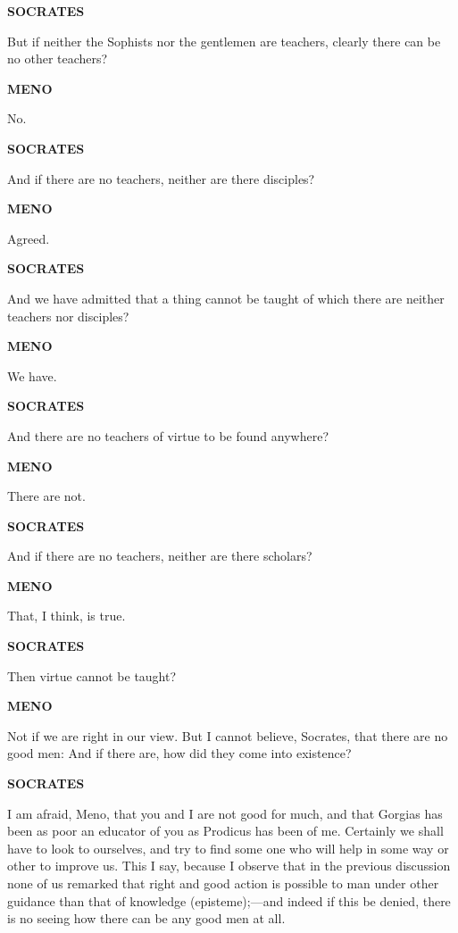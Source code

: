 \documentclass[11pt,letter]{article}
\begin{document}
\par \textbf{SOCRATES}
\par   But if neither the Sophists nor the gentlemen are teachers, clearly there can be no other teachers?

\par \textbf{MENO}
\par   No.

\par \textbf{SOCRATES}
\par   And if there are no teachers, neither are there disciples?

\par \textbf{MENO}
\par   Agreed.

\par \textbf{SOCRATES}
\par   And we have admitted that a thing cannot be taught of which there are neither teachers nor disciples?

\par \textbf{MENO}
\par   We have.

\par \textbf{SOCRATES}
\par   And there are no teachers of virtue to be found anywhere?

\par \textbf{MENO}
\par   There are not.

\par \textbf{SOCRATES}
\par   And if there are no teachers, neither are there scholars?

\par \textbf{MENO}
\par   That, I think, is true.

\par \textbf{SOCRATES}
\par   Then virtue cannot be taught?

\par \textbf{MENO}
\par   Not if we are right in our view. But I cannot believe, Socrates, that there are no good men:  And if there are, how did they come into existence?

\par \textbf{SOCRATES}
\par   I am afraid, Meno, that you and I are not good for much, and that Gorgias has been as poor an educator of you as Prodicus has been of me. Certainly we shall have to look to ourselves, and try to find some one who will help in some way or other to improve us. This I say, because I observe that in the previous discussion none of us remarked that right and good action is possible to man under other guidance than that of knowledge (episteme);—and indeed if this be denied, there is no seeing how there can be any good men at all.
\end{document}
